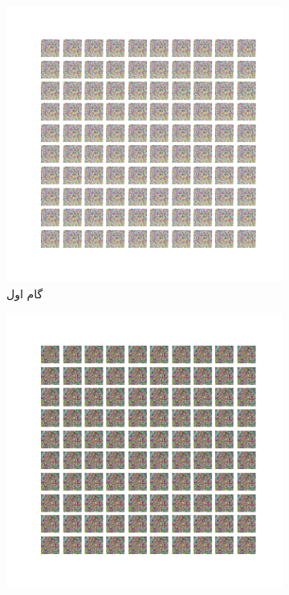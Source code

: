 \documentclass[12pt, a4paper]{book}
\begin{document}
\begin{figure}[h]
    \begin{subfigure}{0.3\linewidth}
        \includegraphics[width=\linewidth]{images/fcgan/nlayer5/generated_img_01.png}
        \caption{گام اول}
    \end{subfigure}
    \begin{subfigure}{0.3\linewidth}
        \includegraphics[width=\linewidth]{images/fcgan/nlayer5/generated_img_15.png}

\end{subfigure}
\end{figure}
\end{document}
